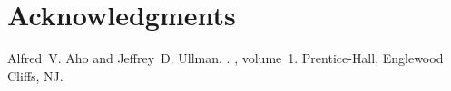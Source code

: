 \documentclass[11pt,letterpaper]{article}
\begin{document}
\section*{Acknowledgments}


\begin{thebibliography}{}

Alfred~V. Aho and Jeffrey~D. Ullman.
.
, volume~1.
\newblock Prentice-{Hall}, Englewood Cliffs, NJ.

%
%
%

\end{thebibliography}
\end{document}
